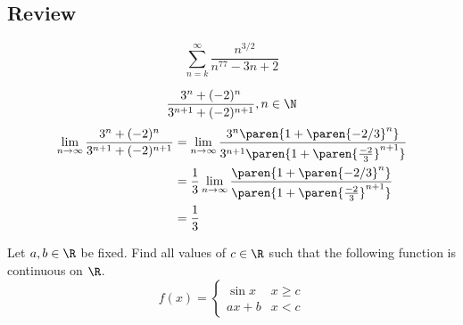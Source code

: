 \subsection*{Review}

\begin{example}
    \[
        \sum_{n=k}^{\infty} \frac{n^{3/2}}{n^{77} - 3n + 2}
    \]
\end{example}

\begin{example}
    \[
        \frac{3^{n} + (-2)^{n}}{3^{n+1} + (-2)^{n+1}}, n \in \N
    \]
    \begin{align*}
        \lim_{n \to \infty} \frac{3^{n} + (-2)^{n}}{3^{n+1} + (-2)^{n+1}} &= \lim_{n \to \infty} \frac{3^{n}\paren{1 + \paren{-2/3}^{n}}}{3^{n+1} \paren{1 + \paren{\frac{-2}{3}}^{n+1}}} \\
        &= \frac{1}{3} \lim_{n \to \infty} \frac{\paren{1 + \paren{-2/3}^{n}}}{\paren{1 + \paren{\frac{-2}{3}}^{n+1}}} \\
        &= \frac{1}{3}
    \end{align*}
\end{example}

\begin{example}
    Let $a, b \in \R$ be fixed. Find all values of $c \in \R$ such that the following function is continuous on $\R$. \[
        f(x) =
        \begin{cases}
            \sin x & x \geq c \\
            ax + b & x < c
        \end{cases}
    \]
\end{example}

